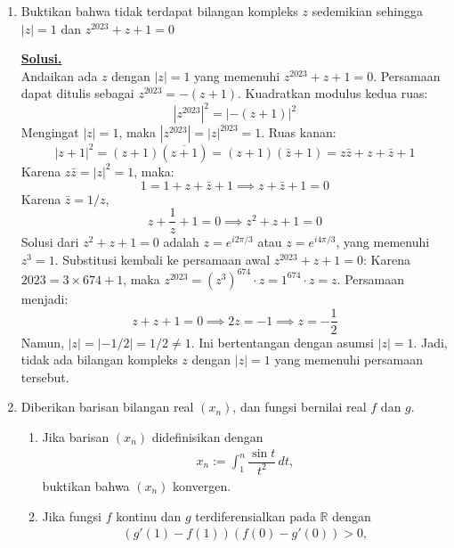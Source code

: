 \documentclass[12pt,twoside]{article}
\newenvironment{solution}
{
	\par\noindent\textbf{\underline{Solusi.}}\\
}
{
	\par
}
\begin{document}
\begin{enumerate}
\begin{solution}
          Jadi, elemen ke-6 terkecil yang mungkin agar himpunan tersebut tidak memuat solusi adalah 427.
          Diketahui $x_6 \le 426$.
          Ini adalah kontradiksi.
          Oleh karena itu, pasti terdapat tiga bilangan yang memenuhi kondisi tersebut.
        \end{solution}
  \item Buktikan bahwa tidak terdapat bilangan kompleks $z$ sedemikian sehingga $|z|=1$ dan $z^{2023}+z+1=0$
        \begin{solution}
          Andaikan ada $z$ dengan $|z|=1$ yang memenuhi $z^{2023}+z+1=0$.
          Persamaan dapat ditulis sebagai $z^{2023} = -(z+1)$.
          Kuadratkan modulus kedua ruas:
          \[ |z^{2023}|^2 = |-(z+1)|^2 \]
          Mengingat $|z|=1$, maka $|z^{2023}| = |z|^{2023} = 1$.
          Ruas kanan:
          \[ |z+1|^2 = (z+1)(\overline{z+1}) = (z+1)(\bar{z}+1) = z\bar{z} + z + \bar{z} + 1 \]
          Karena $z\bar{z} = |z|^2 = 1$, maka:
          \[ 1 = 1 + z + \bar{z} + 1 \implies z + \bar{z} + 1 = 0 \]
          Karena $\bar{z} = 1/z$,
          \[ z + \frac{1}{z} + 1 = 0 \implies z^2 + z + 1 = 0 \]
          Solusi dari $z^2+z+1=0$ adalah $z = e^{i 2\pi/3}$ atau $z = e^{i 4\pi/3}$, yang memenuhi $z^3 = 1$.
          Substitusi kembali ke persamaan awal $z^{2023}+z+1=0$:
          Karena $2023 = 3 \times 674 + 1$, maka $z^{2023} = (z^3)^{674} \cdot z = 1^{674} \cdot z = z$.
          Persamaan menjadi:
          \[ z + z + 1 = 0 \implies 2z = -1 \implies z = -\frac{1}{2} \]
          Namun, $|z| = |-1/2| = 1/2 \neq 1$.
          Ini bertentangan dengan asumsi $|z|=1$.
          Jadi, tidak ada bilangan kompleks $z$ dengan $|z|=1$ yang memenuhi persamaan tersebut.
        \end{solution}
  \item Diberikan barisan bilangan real $(x_n)$, dan fungsi bernilai real $f$ dan $g$.
        \begin{enumerate}
          \item Jika barisan $(x_n)$ didefinisikan dengan \begin{align*}
                  x_n := \int_1^n \dfrac{\sin t}{t^2}\, dt,
                \end{align*}
                buktikan bahwa $(x_n)$ konvergen.
          \item Jika fungsi $f$ kontinu dan $g$ terdiferensialkan pada $\mathbb{R}$ dengan
                \begin{align*}
                  (g'(1)-f(1))(f(0)-g'(0))>0,
                \end{align*}

\end{enumerate}
\end{enumerate}
\end{document}
